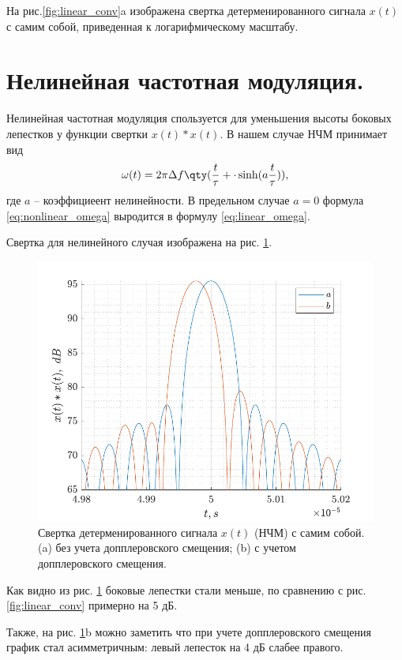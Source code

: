 \documentclass[a4paper,14pt]{extarticle}
\begin{document}
На рис.\ref{fig:linear_conv}a изображена свертка детерменированного сигнала $x(t)$ с
самим собой, приведенная к логарифмическому масштабу.

\section{Нелинейная частотная модуляция.}%
\label{sec:nelineinaia_chastotnaia_moduliatsiia_}

Нелинейная частотная модуляция спользуется для уменьшения высоты боковых
лепестков у функции свертки $x(t) * x(t)$. В нашем случае НЧМ принимает вид
\begin{equation}
    \label{eq:nonlinear_omega}
    \omega(t) = 2 \pi \Delta f \qty(\frac{t}{\tau} + \cdot
    \sinh(a\frac{t}{\tau})),
\end{equation}
где $a$ -- коэффициеент нелинейности. В предельном случае $a =0$ формула
\eqref{eq:nonlinear_omega} выродится в формулу \eqref{eq:linear_omega}.

Свертка для нелинейного случая изображена на рис. \ref{fig:nonlinear_conv}.

\begin{figure}[h!]
    \centering
    \includegraphics[scale=1]{fig/nonlinear_conv}
    \caption{Свертка детерменированного сигнала $x(t)$ (НЧМ) с самим собой.
    (a) без учета допплеровского смещения;
    (b) с учетом допплеровского смещения.}
    \label{fig:nonlinear_conv}
\end{figure}

Как видно из рис. \ref{fig:nonlinear_conv} боковые лепестки стали меньше, по
сравнению с рис. \ref{fig:linear_conv} примерно на 5 дБ. 

Также, на рис. \ref{fig:nonlinear_conv}b можно заметить что при учете допплеровского
смещения график стал асимметричным: левый лепесток на 4 дБ слабее правого.
\end{document}
